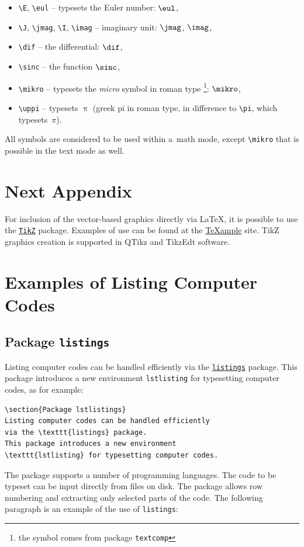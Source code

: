 \begin{itemize}
  \item
    \verb|\E|, \verb|\eul| -- typesets the Euler number: $\eul$,
  \item
    \verb|\J|, \verb|\jmag|, \verb|\I|, \verb|\imag| -- imaginary unit: $\jmag$, $\imag$,
  \item
    \verb|\dif| -- the differential: $\dif$,
  \item
    \verb|\sinc| -- the function $\sinc$,
  \item
    \verb|\mikro| -- typesets the \emph{micro} symbol in roman type%
			\footnote{the symbol comes from package \texttt{textcomp}}: $\mikro$,
	\item
		\verb|\uppi| -- typesets $\uppi$
			(greek pi in roman type, in difference to \verb|\pi|, which typesets~$\pi$).
\end{itemize}
%
All symbols are considered to be used within a~math mode, except \verb|\mikro| that is possible in the text mode as well.


\chapter{Next Appendix}



For inclusion of the vector-based graphics directly via \LaTeX, it is possible to use the \href{https://www.ctan.org/pkg/pgf}{\texttt{TikZ}} package.
Examples of use can be found at the \href{http://www.texample.net/tikz/examples/}{\TeX{}ample} site.
TikZ graphics creation is supported in QTikz and TikzEdt software.




\chapter{Examples of Listing Computer Codes}

\section{Package \texttt{listings}}

Listing computer codes can be handled efficiently via the \href{https://www.ctan.org/pkg/listings}{\texttt{listings}} package.
This package introduces a new environment \texttt{lstlisting} for typesetting computer codes, as for example:
%
\begin{lstlisting}[language={[LaTeX]TeX}]
\section{Package lstlistings}
Listing computer codes can be handled efficiently
via the \texttt{listings} package.
This package introduces a new environment
\texttt{lstlisting} for typesetting computer codes.
\end{lstlisting}
%
The package supports a number of programming languages.
The code to be typeset can be input directly from files on disk.
The package allows row numbering and extracting only selected parts of the code.
The following paragraph is an example of the use of \texttt{listings}:
\bigskip

